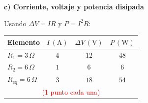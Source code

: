 \documentclass[11pt,a4paper]{article}
\begin{document}
\medskip
\textbf{c) Corriente, voltaje y potencia disipada}\par
Usando $\Delta V=IR$ y $P=I^2R$:
\begin{center}
\begin{tabular}{lccc}
\toprule
Elemento & $I\,(\mathrm A)$ & $\Delta V\,(\mathrm V)$ & $P\,(\mathrm W)$\\
\midrule
$R_1=3\,\Omega$ & $4$ & $12$ & $48$\\
$R_2=6\,\Omega$ & $1$ & $6$ & $6$\\
$R_{\mathrm{eq}}=6\,\Omega$ & $3$ & $18$ & $54$\\
\bottomrule
\multicolumn{4}{c}{\textcolor{red}{(1 punto cada una)}}
\end{tabular}
\end{center}
\end{document}
